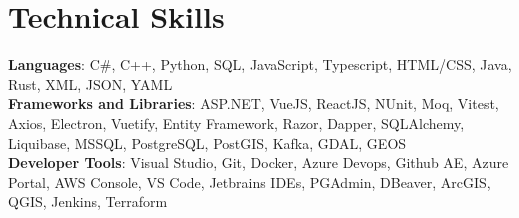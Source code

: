 \documentclass[letterpaper,11pt]{article}
\begin{document}
\section{Technical Skills}
\begin{itemize}[leftmargin=0.15in, label={}]
   \small{\item{
    \textbf{Languages}{: C\#, C++, Python, SQL, JavaScript, Typescript, HTML/CSS, Java, Rust, XML, JSON, YAML} \\
    \textbf{Frameworks and Libraries}{: ASP.NET, VueJS, ReactJS, NUnit, Moq, Vitest, Axios, Electron, Vuetify, Entity Framework, Razor, Dapper, SQLAlchemy, Liquibase, MSSQL, PostgreSQL, PostGIS, Kafka, GDAL, GEOS} \\
    \textbf{Developer Tools}{: Visual Studio, Git, Docker, Azure Devops, Github AE, Azure Portal, AWS Console, VS Code, Jetbrains IDEs, PGAdmin, DBeaver, ArcGIS, QGIS, Jenkins, Terraform}
   }}
\end{itemize}


\end{document}

